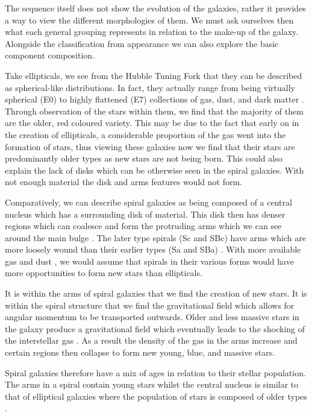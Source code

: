 \documentclass[12pt, twocolumn]{revtex4}    %
\begin{document}
The sequence itself does not show the evolution of the galaxies, rather it provides a way to view the different morphologies of them. We must ask ourselves then what each general grouping represents in relation to the make-up of the galaxy. Alongside the classification from appearance we can also explore the basic component composition.

Take ellipticals, we see from the Hubble Tuning Fork that they can be described as spherical-like distributions. In fact, they actually range from being virtually spherical (E0) to highly flattened (E7) collections of gas, dust, and dark matter \cite{moore_databook}. Through observation of the stars within them, we find that the majority of them are the older, red coloured variety. This may be due to the fact that early on in the creation of ellipticals, a considerable proportion of the gas went into the formation of stars, thus viewing these galaxies now we find that their stars are predominantly older types \cite{carroll_astro} as new stars are not being born. This could also explain the lack of disks which can be otherwise seen in the spiral galaxies. With not enough material the disk and arms features would not form.

Comparatively, we can describe spiral galaxies as being composed of a central nucleus which has a surrounding disk of material. This disk then has denser regions which can coalesce and form the protruding arms which we can see around the main bulge \cite{carroll_astro}. The later type spirals (Sc and SBc) have arms which are more loosely wound than their earlier types (Sa and SBa) \cite{moore_databook}. With more available gas and dust \cite{carroll_astro}, we would assume that spirals in their various forms would have more opportunities to form new stars than ellipticals. 

It is within the arms of spiral galaxies that we find the creation of new stars. It is within the spiral structure that we find the gravitational field which allows for angular momentum to be transported outwards. Older and less massive stars in the galaxy produce a gravitational field which eventually leads to the shocking of the interstellar gas \cite{binney_galaxies}. As a result the density of the gas in the arms increase and certain regions then collapse to form new young, blue, and massive stars. 

Spiral galaxies therefore have a mix of ages in relation to their stellar population. The arms in a spiral contain young stars whilst the central nucleus is similar to that of elliptical galaxies where the population of stars is composed of older types \cite{carroll_astro, binney_galaxies}.
\end{document}
